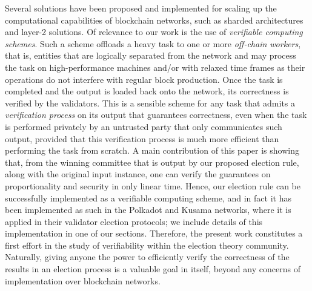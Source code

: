 Several solutions have been proposed and implemented for scaling up the computational capabilities of blockchain networks, such as sharded architectures and layer-2 solutions. Of relevance to our work is the use of \emph{verifiable computing schemes}. Such a scheme offloads a heavy task to one or more \emph{off-chain workers}, that is, entities that are logically separated from the network and may process the task on high-performance machines and/or with relaxed time frames as their operations do not interfere with regular block production. Once the task is completed and the output is loaded back onto the network, its correctness is verified by the validators. This is a sensible scheme for any task that admits a \emph{verification process} on its output that guarantees correctness, even when the task is performed privately by an untrusted party that only communicates such output, provided that this verification process is much more efficient than performing the task from scratch. A main contribution of this paper is showing that, from the winning committee that is output by our proposed election rule, along with the original input instance, one can verify the guarantees on proportionality and security in only linear time. Hence, our election rule can be successfully implemented as a verifiable computing scheme, and in fact it has been implemented as such in the Polkadot and Kusama networks, where it is applied in their validator election protocols; we include details of this implementation in one of our sections. Therefore, the present work constitutes a first effort in the study of verifiability within the election theory community. Naturally, giving anyone the power to efficiently verify the correctness of the results in an election process is a valuable goal in itself, beyond any concerns of implementation over blockchain networks.

